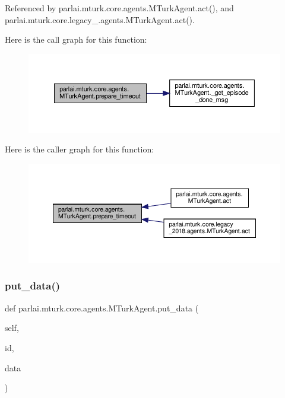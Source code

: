 Referenced by parlai.\+mturk.\+core.\+agents.\+M\+Turk\+Agent.\+act(), and parlai.\+mturk.\+core.\+legacy\+\_.\+agents.\+M\+Turk\+Agent.\+act().

Here is the call graph for this function\+:
\nopagebreak
\begin{figure}[H]
\begin{center}
\leavevmode
\includegraphics[width=350pt]{classparlai_1_1mturk_1_1core_1_1agents_1_1MTurkAgent_a547ab71740a8dccd4a94150109876c9c_cgraph}
\end{center}
\end{figure}
Here is the caller graph for this function\+:
\nopagebreak
\begin{figure}[H]
\begin{center}
\leavevmode
\includegraphics[width=350pt]{classparlai_1_1mturk_1_1core_1_1agents_1_1MTurkAgent_a547ab71740a8dccd4a94150109876c9c_icgraph}
\end{center}
\end{figure}
\mbox{\label{classparlai_1_1mturk_1_1core_1_1agents_1_1MTurkAgent_a99af17351b0e8dd9b8c091bda19bd9af}} 
\subsubsection{\texorpdfstring{put\+\_\+data()}{put\_data()}}
{\footnotesize\ttfamily def parlai.\+mturk.\+core.\+agents.\+M\+Turk\+Agent.\+put\+\_\+data (\begin{DoxyParamCaption}\item[{}]{self,  }\item[{}]{id,  }\item[{}]{data }\end{DoxyParamCaption})}

